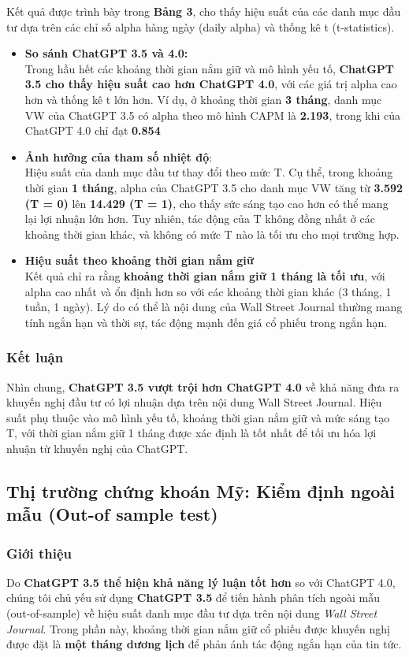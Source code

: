 \documentclass[a4paper,12pt]{article}
\begin{document}
Kết quả được trình bày trong \textbf{Bảng 3}, cho thấy hiệu suất của các danh mục đầu tư dựa trên các chỉ số alpha hàng ngày (daily alpha) và thống kê t (t-statistics).
\begin{itemize}
    \item \textbf{So sánh ChatGPT 3.5 và 4.0:}
    \\Trong hầu hết các khoảng thời gian nắm giữ và mô hình yếu tố, \textbf{ChatGPT 3.5 cho thấy hiệu suất cao hơn ChatGPT 4.0}, với các giá trị alpha cao hơn và thống kê t lớn hơn. Ví dụ, ở khoảng thời gian \textbf{3 tháng}, danh mục VW của ChatGPT 3.5 có alpha theo mô hình CAPM là \textbf{2.193}, trong khi của ChatGPT 4.0 chỉ đạt \textbf{0.854}
    \item \textbf{Ảnh hưởng của tham số nhiệt độ}:
    \\ Hiệu suất của danh mục đầu tư thay đổi theo mức T. Cụ thể, trong khoảng thời gian \textbf{1 tháng}, alpha của ChatGPT 3.5 cho danh mục VW tăng từ \textbf{3.592 (T = 0)} lên \textbf{14.429 (T = 1)}, cho thấy sức sáng tạo cao hơn có thể mang lại lợi nhuận lớn hơn. Tuy nhiên, tác động của T không đồng nhất ở các khoảng thời gian khác, và không có mức T nào là tối ưu cho mọi trường hợp.
    \item \textbf{Hiệu suất theo khoảng thời gian nắm giữ}
    \\Kết quả chỉ ra rằng \textbf{khoảng thời gian nắm giữ 1 tháng là tối ưu}, với alpha cao nhất và ổn định hơn so với các khoảng thời gian khác (3 tháng, 1 tuần, 1 ngày). Lý do có thể là nội dung của Wall Street Journal thường mang tính ngắn hạn và thời sự, tác động mạnh đến giá cổ phiếu trong ngắn hạn.
\end{itemize}
\subsubsection{Kết luận}
Nhìn chung, \textbf{ChatGPT 3.5 vượt trội hơn ChatGPT 4.0} về khả năng đưa ra khuyến nghị đầu tư có lợi nhuận dựa trên nội dung Wall Street Journal. Hiệu suất phụ thuộc vào mô hình yếu tố, khoảng thời gian nắm giữ và mức sáng tạo T, với thời gian nắm giữ 1 tháng được xác định là tốt nhất để tối ưu hóa lợi nhuận từ khuyến nghị của ChatGPT.
\subsection{Thị trường chứng khoán Mỹ: Kiểm định ngoài mẫu  (Out-of sample test)}

\subsubsection{Giới thiệu}
Do \textbf{ChatGPT 3.5 thể hiện khả năng lý luận tốt hơn} so với ChatGPT 4.0, chúng tôi chủ yếu sử dụng \textbf{ChatGPT 3.5} để tiến hành phân tích ngoài mẫu (out-of-sample) về hiệu suất danh mục đầu tư dựa trên nội dung \textit{Wall Street Journal}. Trong phần này, khoảng thời gian nắm giữ cổ phiếu được khuyến nghị được đặt là \textbf{một tháng dương lịch} để phản ánh tác động ngắn hạn của tin tức.
\end{document}
